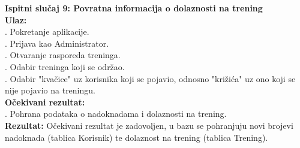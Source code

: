 \documentclass[times, utf8, zavrsni]{fer}
\begin{document}
		\noindent \textbf{Ispitni slučaj 9: Povratna informacija o dolaznosti na trening}\\
			\textbf{Ulaz:}\\
			    . Pokretanje aplikacije.\\
			    . Prijava kao Administrator.\\
			    . Otvaranje rasporeda treninga.\\
			    . Odabir treninga koji se održao.\\
			    . Odabir "kvačice" uz korisnika koji se pojavio, odnosno "križića" uz ono koji se nije pojavio na treningu.\\
			   
			\noindent\textbf{Očekivani rezultat:}\\
			    . Pohrana podataka o nadoknadama i dolaznosti na trening.\\
			    
			\noindent\textbf{Rezultat:}
			    \noindent Očekivani rezultat je zadovoljen, u bazu se pohranjuju novi brojevi nadoknada (tablica Korisnik) te dolaznost na trening (tablica Trening).
			    
\end{document}
